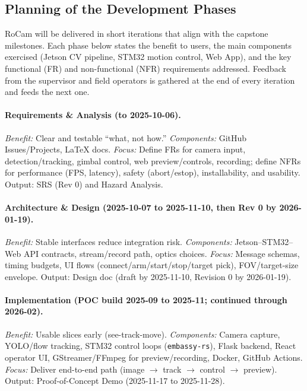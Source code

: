 \documentclass[12pt]{article}
\begin{document}
\subsection{Planning of the Development Phases}

RoCam will be delivered in short iterations that align with the capstone
milestones. Each phase below states the benefit to users, the main components
exercised (Jetson CV pipeline, STM32 motion control, Web App), and the key
functional (FR) and non-functional (NFR) requirements addressed. Feedback from
the supervisor and field operators is gathered at the end of every iteration
and feeds the next one.

\paragraph{Requirements \& Analysis (to 2025-10-06).}
\emph{Benefit:} Clear and testable “what, not how.”
\emph{Components:} GitHub Issues/Projects, LaTeX docs.
\emph{Focus:} Define FRs for camera input, detection/tracking, gimbal control, web preview/controls, recording; define NFRs for performance (FPS, latency), safety (abort/estop), installability, and usability. Output: SRS (Rev 0) and Hazard Analysis.

\paragraph{Architecture \& Design (2025-10-07 to 2025-11-10, then Rev 0 by 2026-01-19).}
\emph{Benefit:} Stable interfaces reduce integration risk.
\emph{Components:} Jetson–STM32–Web API contracts, stream/record path, optics choices.
\emph{Focus:} Message schemas, timing budgets, UI flows (connect/arm/start/stop/target pick), FOV/target-size envelope. Output: Design doc (draft by 2025-11-10, Revision 0 by 2026-01-19).

\paragraph{Implementation (POC build 2025-09 to 2025-11; continued through 2026-02).}
\emph{Benefit:} Usable slices early (see-track-move).
\emph{Components:} Camera capture, YOLO/flow tracking, STM32 control loops (\texttt{embassy-rs}), Flask backend, React operator UI, GStreamer/FFmpeg for preview/recording, Docker, GitHub Actions.
\emph{Focus:} Deliver end-to-end path (image $\rightarrow$ track $\rightarrow$ control $\rightarrow$ preview). Output: Proof-of-Concept Demo (2025-11-17 to 2025-11-28).
\end{document}
